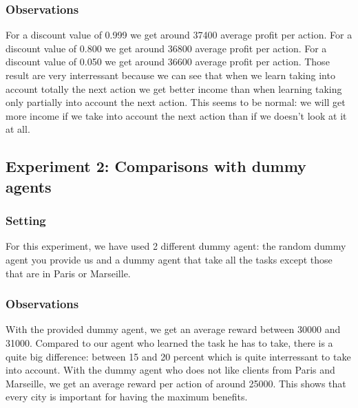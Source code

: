 \documentclass[11pt]{article}
\begin{document}
\subsubsection{Observations}
For a discount value of 0.999 we get around 37400 average profit per action.
\newline
For a discount value of 0.800 we get around 36800 average profit per action.
\newline
For a discount value of 0.050 we get around 36600 average profit per action.
\newline
Those result are very interressant because we can see that when we learn taking into account totally the next action we get better income than when learning taking only partially into account the next action. This seems to be normal: we will get more income if we take into account the next action than if we doesn't look at it at all. 


\subsection{Experiment 2: Comparisons with dummy agents}

\subsubsection{Setting}
For this experiment, we have used 2 different dummy agent: the random dummy agent you provide us and a dummy agent that take all the tasks except those that are in Paris or Marseille.

\subsubsection{Observations}
With the provided dummy agent, we get an average reward between 30000 and 31000. Compared to our agent who learned the task he has to take, there is a quite big difference: between 15 and 20 percent which is quite interressant to take into account.
With the dummy agent who does not like clients from Paris and Marseille, we get an average reward per action of around 25000. This shows that every city is important for having the maximum benefits.
\end{document}
